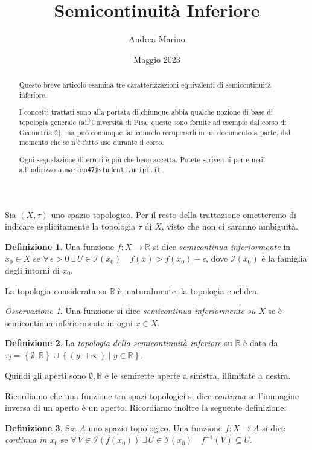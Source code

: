 \documentclass[a4paper, 11pt]{article}
\title{Semicontinuità Inferiore}
\author{Andrea Marino}
\date{Maggio 2023}
\newcommand{\R}{\mathbb{R}}
\newcommand{\I}[1]{\mathcal{I}(#1)}
\theoremstyle{plain} 	%
\theoremstyle{definition}
\newtheorem{definizione}{Definizione}
\theoremstyle{remark}
\newtheorem*{oss*}{Osservazione}
\begin{document}
    \maketitle
    
    \begin{abstract}
        Questo breve articolo esamina tre caratterizzazioni equivalenti di semicontinuità inferiore. 

        I concetti trattati sono alla portata di chiunque abbia qualche nozione di base di topologia generale (all'Università di Pisa, queste sono fornite ad esempio dal corso di Geometria 2), ma può comunque far comodo recuperarli in un documento a parte, 
        dal momento che se n'è fatto uso durante il corso.

        Ogni segnalazione di errori è più che bene accetta. Potete scrivermi per e-mail all'indirizzo 
		\texttt{a.marino47@studenti.unipi.it}
    \end{abstract}

    Sia $\left(X,\tau\right)$ uno spazio topologico. Per il resto della trattazione ometteremo di indicare esplicitamente la topologia $\tau$ di $X$, visto che non ci saranno ambiguità.
    \begin{definizione}
        Una funzione $f\colon X\to\R$ si dice \emph{semicontinua inferiormente} in $x_0\in X$ se $\forall\,\epsilon>0\ \exists\,U\in\I{x_0}\quad f(x)>f(x_0)-\epsilon$, dove $\I{x_0}$ è la famiglia degli intorni di $x_0$.
    \end{definizione}
    La topologia considerata su $\R$ è, naturalmente, la topologia euclidea.
    \begin{oss*}
        Una funzione si dice \emph{semicontinua inferiormente su $X$} se è semicontinua inferiormente in ogni $x\in X$.
    \end{oss*}
    \begin{definizione}\label{def:top_sci}
        La \emph{topologia della semicontinuità inferiore} su $\R$ è data da $\tau_I=\left\{\emptyset,\R\right\}\cup\left\{(y,+\infty)\mid y\in\R\right\}$.
    \end{definizione}
    Quindi gli aperti sono $\emptyset, \R$ e le semirette aperte a sinistra, illimitate a destra.

    Ricordiamo che una funzione tra spazi topologici si dice \emph{continua} se l'immagine inversa di un aperto è un aperto. Ricordiamo inoltre la seguente definizione:

    \begin{definizione}\label{def:cont_pt}
        Sia $A$ uno spazio topologico. Una funzione $f\colon X\to A$ si dice \emph{continua in $x_0$} se $\forall\,V\in\I{f(x_0)}\ \exists\,U\in\I{x_0}\quad f^{-1}\left(V\right)\subseteq U$.
    \end{definizione}
\end{document}
